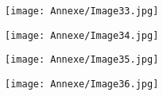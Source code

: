     \begin{figure}[H]
   \centering
   \texttt{[image: Annexe/Image33.jpg]}
	\caption{\cite{specialelsa}}\label{fig:elsa8}
    \end{figure}


    \begin{figure}[H]
   \centering
   \texttt{[image: Annexe/Image34.jpg]}
	\caption{\cite{avantgarde}}\label{fig:avantgarde1}
    \end{figure}


    \begin{figure}[H]
   \centering
   \texttt{[image: Annexe/Image35.jpg]}
	\caption{\cite{pabloneruda}}\label{fig:darmangeatneruda}
    \end{figure}


    \begin{figure}[H]
   \centering
   \texttt{[image: Annexe/Image36.jpg]}
	\caption{\cite{sivous}}\label{fig:sivous}
    \end{figure}